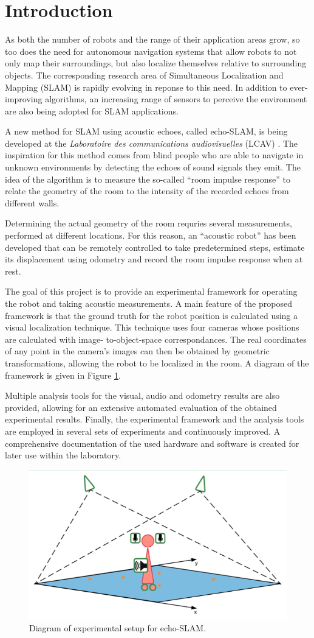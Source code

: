 \section{Introduction}

\setlength{\parskip}{1em}
As both the number of robots and the range of their application areas grow, so too does the need for autonomous navigation systems that allow robots to not only map their surroundings, but also localize themselves relative to surrounding objects.
The corresponding research area of Simultaneous Localization and Mapping (SLAM) is rapidly evolving in reponse to this need. In addition to ever-improving algorithms, an increasing range of sensors to perceive the environment are also being adopted for SLAM applications. 

A new method for SLAM using acoustic echoes, called echo-SLAM, is being developed at the \textit{Laboratoire des communications audiovisuelles} (LCAV) \cite{Miranda}. The inspiration for this method comes from blind people who are able to navigate in unknown environments by detecting the echoes of sound signals they emit. The idea of the algorithm is to measure the so-called ``room impulse response'' to relate the geometry of the room to the intensity of the recorded echoes from different walls. 

Determining the actual geometry of the room requries several measurements, performed at different locations. 
For this reason, an ``acoustic robot'' has been developed that can be remotely controlled to take predetermined steps, estimate its displacement using odometry and record the room impulse response when at rest. 

The goal of this project is to provide an experimental framework for operating the robot and taking acoustic measurements. 
A main feature of the proposed framework is that the ground truth for the robot position is calculated using a visual localization technique. 
This technique uses four cameras whose positions are calculated with image- to-object-space correspondances. 
The real coordinates of any point in the camera's images can then be obtained by geometric transformations, allowing the robot to be localized in the room.
A diagram of the framework is given in Figure \ref{fig:setup}. 

Multiple analysis tools for the visual, audio and odometry results are also provided, allowing for an extensive automated evaluation of the obtained experimental results. 
Finally, the experimental framework and the analysis tools are employed in several sets of experiments and continuously improved. A comprehensive documentation of the used hardware and software is created for later use within the laboratory.  


\begin{figure}[b]
    \centering
    \includegraphics[width=.6\linewidth]{files/Setup.png}
    \caption{Diagram of experimental setup for echo-SLAM.}
    \label{fig:setup}
\end{figure}

\setlength{\parskip}{0em}
